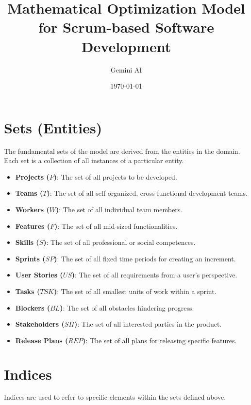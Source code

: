 \documentclass[11pt]{article}
\title{Mathematical Optimization Model for Scrum-based Software Development}
\author{Gemini AI}
\date{\today}
\begin{document}
\maketitle
\thispagestyle{empty}

\newpage
\tableofcontents
\thispagestyle{empty}

\newpage
\setcounter{page}{1}

\section{Sets (Entities)}
The fundamental sets of the model are derived from the entities in the domain. Each set is a collection of all instances of a particular entity.

\begin{itemize}
    \item \textbf{Projects ($P$)}: The set of all projects to be developed.
    \item \textbf{Teams ($T$)}: The set of all self-organized, cross-functional development teams.
    \item \textbf{Workers ($W$)}: The set of all individual team members.
    \item \textbf{Features ($F$)}: The set of all mid-sized functionalities.
    \item \textbf{Skills ($S$)}: The set of all professional or social competences.
    \item \textbf{Sprints ($SP$)}: The set of all fixed time periods for creating an increment.
    \item \textbf{User Stories ($US$)}: The set of all requirements from a user's perspective.
    \item \textbf{Tasks ($TSK$)}: The set of all smallest units of work within a sprint.
    \item \textbf{Blockers ($BL$)}: The set of all obstacles hindering progress.
    \item \textbf{Stakeholders ($SH$)}: The set of all interested parties in the product.
    \item \textbf{Release Plans ($REP$)}: The set of all plans for releasing specific features.
\end{itemize}

\section{Indices}
Indices are used to refer to specific elements within the sets defined above.
\end{document}
